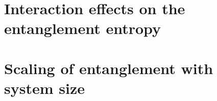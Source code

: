\section{Interaction effects on the entanglement entropy}

\section{Scaling of entanglement with system size}